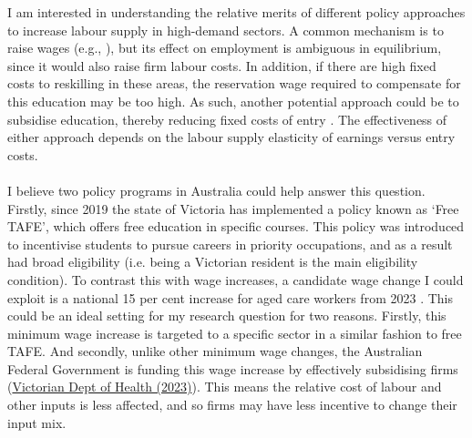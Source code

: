  I am interested in understanding the relative merits of different policy approaches to increase labour supply in high-demand sectors. A common mechanism is to raise wages (e.g., \cite{dalbo_finan_rossi2013}), but its effect on employment is ambiguous in equilibrium, since it would also raise firm labour costs. In addition, if there are high fixed costs to reskilling in these areas, the reservation wage required to compensate for this education may be too high. As such, another potential approach could be to subsidise education, thereby reducing fixed costs of entry \citep{schoonover2026}. The effectiveness of either approach depends on the labour supply elasticity of earnings versus entry costs. \\~\\I believe two policy programs in Australia could help answer this question. Firstly, since 2019 the state of Victoria has implemented a policy known as `Free TAFE', which offers free education in specific courses. This policy was introduced to incentivise students to pursue careers in priority occupations, and as a result had broad eligibility (i.e. being a Victorian resident is the main eligibility condition). To contrast this with wage increases, a candidate wage change I could exploit is a national 15 per cent increase for aged care workers from 2023 \citep{fwc_agedcare2022}. This could be an ideal setting for my research question for two reasons. Firstly, this minimum wage increase is targeted to a specific sector in a similar fashion to free TAFE. And secondly, unlike other minimum wage changes, the Australian Federal Government is  funding this wage increase by effectively subsidising firms (\href{https://www.health.gov.au/ministers/the-hon-mark-butler-mp/media/budget-2023-24-delivering-the-largest-ever-pay-rise-to-aged-care-workers?language=en&utm_source=miragenews&utm_medium=miragenews&utm_campaign=news}{Victorian Dept of Health (2023)}). This means the relative cost of labour and other inputs is less affected, and so firms may have less incentive to change their input mix. \\~\\
